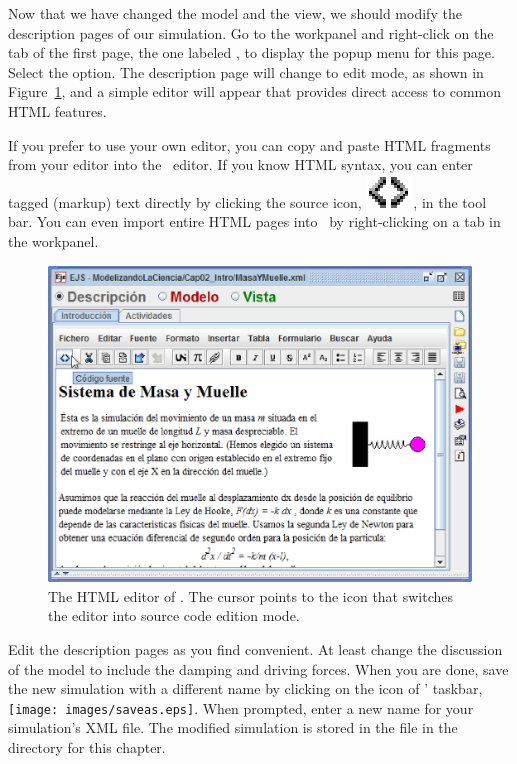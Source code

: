 Now that we have changed the model and the view, we should modify the description pages of our simulation. Go to the  workpanel and right-click on the tab of the first page, the one labeled , to display the popup menu for this page. Select the  option. The description page will change to edit mode, as shown in Figure~\ref{fig:02EjsIntro/ModifyHTML}, and a simple editor will appear that provides direct access to common HTML features.

If you prefer to use your own editor, you can copy and paste HTML fragments from your editor into the \ejs\ editor. If you know HTML syntax, you can enter tagged (markup) text directly by clicking the source icon, \includegraphics[scale=\linescale]{02EjsIntro/images/SourceHK.eps}, in the tool bar.  You can even import entire HTML pages into \ejs\ by right-clicking on a tab in the workpanel.

\begin{figure}[htb]
    \centering
  \includegraphics[scale=\scale]{02EjsIntro/images/ModifyHTML.eps}
    \caption{The HTML editor of \ejs. The cursor points to the icon that switches the editor into source code edition mode.}
    \label{fig:02EjsIntro/ModifyHTML}
\end{figure}

Edit the description pages as you find convenient. At least change the discussion of the model to include the damping and driving forces. When you are done, save the new simulation with a different name by clicking on the  icon of \ejs' taskbar, \texttt{[image: images/saveas.eps]}. When prompted, enter a new name for your simulation's XML file. The modified simulation is stored in the  file in the  directory for this chapter.

